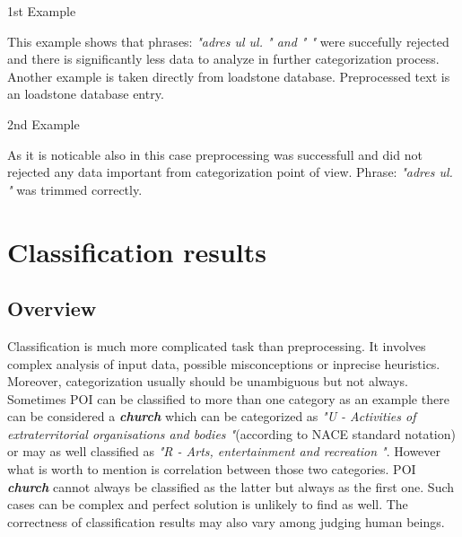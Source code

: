\begin{algorithm}[h]
\caption{1st Example}\label{alg:1st}
\end{algorithm}
This example shows that phrases: \textit{"adres ul ul. " and " "} were succefully rejected and there is significantly less data to analyze in further categorization process.
\newline
Another example is taken directly from loadstone database. Preprocessed text is an loadstone database entry.
\begin{algorithm}[h]
\caption{2nd Example}\label{alg:2nd}
\end{algorithm}
As it is noticable also in this case preprocessing was successfull and did not rejected any data important from categorization point of view. Phrase: \textit{"adres ul. "} was trimmed correctly.
 
  
\section{Classification results}
\label{classification_results}
\subsection{Overview}
Classification is much more complicated task than preprocessing. It involves complex analysis of input data, possible misconceptions or inprecise heuristics. Moreover, categorization usually should be unambiguous but not always. Sometimes POI can be classified to more than one category as an example there can be considered a \textit{\textbf{church}} which can be categorized as \textit{"U - Activities of extraterritorial organisations and bodies "}(according to NACE standard notation) or may as well classified as \textit{"R - Arts, entertainment and recreation "}. However what is worth to mention is correlation between those two categories. POI \textit{\textbf{church}} cannot always be classified as the latter but always as the first one. Such cases can be complex and perfect solution is unlikely to find as well. The correctness of classification results may also vary among judging human beings.    
